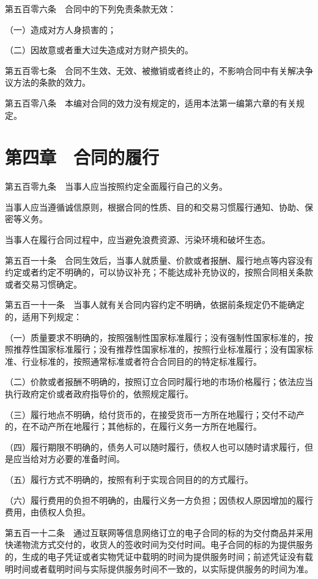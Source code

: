 \documentclass[UTF8,12pt,a4paper]{ctexbook}
\begin{document}
第五百零六条　合同中的下列免责条款无效：

（一）造成对方人身损害的；

（二）因故意或者重大过失造成对方财产损失的。

第五百零七条　合同不生效、无效、被撤销或者终止的，不影响合同中有关解决争议方法的条款的效力。

第五百零八条　本编对合同的效力没有规定的，适用本法第一编第六章的有关规定。

\section*{第四章　合同的履行}

第五百零九条　当事人应当按照约定全面履行自己的义务。

当事人应当遵循诚信原则，根据合同的性质、目的和交易习惯履行通知、协助、保密等义务。

当事人在履行合同过程中，应当避免浪费资源、污染环境和破坏生态。

第五百一十条　合同生效后，当事人就质量、价款或者报酬、履行地点等内容没有约定或者约定不明确的，可以协议补充；不能达成补充协议的，按照合同相关条款或者交易习惯确定。

第五百一十一条　当事人就有关合同内容约定不明确，依据前条规定仍不能确定的，适用下列规定：

（一）质量要求不明确的，按照强制性国家标准履行；没有强制性国家标准的，按照推荐性国家标准履行；没有推荐性国家标准的，按照行业标准履行；没有国家标准、行业标准的，按照通常标准或者符合合同目的的特定标准履行。

（二）价款或者报酬不明确的，按照订立合同时履行地的市场价格履行；依法应当执行政府定价或者政府指导价的，依照规定履行。

（三）履行地点不明确，给付货币的，在接受货币一方所在地履行；交付不动产的，在不动产所在地履行；其他标的，在履行义务一方所在地履行。

（四）履行期限不明确的，债务人可以随时履行，债权人也可以随时请求履行，但是应当给对方必要的准备时间。

（五）履行方式不明确的，按照有利于实现合同目的的方式履行。

（六）履行费用的负担不明确的，由履行义务一方负担；因债权人原因增加的履行费用，由债权人负担。

第五百一十二条　通过互联网等信息网络订立的电子合同的标的为交付商品并采用快递物流方式交付的，收货人的签收时间为交付时间。电子合同的标的为提供服务的，生成的电子凭证或者实物凭证中载明的时间为提供服务时间；前述凭证没有载明时间或者载明时间与实际提供服务时间不一致的，以实际提供服务的时间为准。
\end{document}
